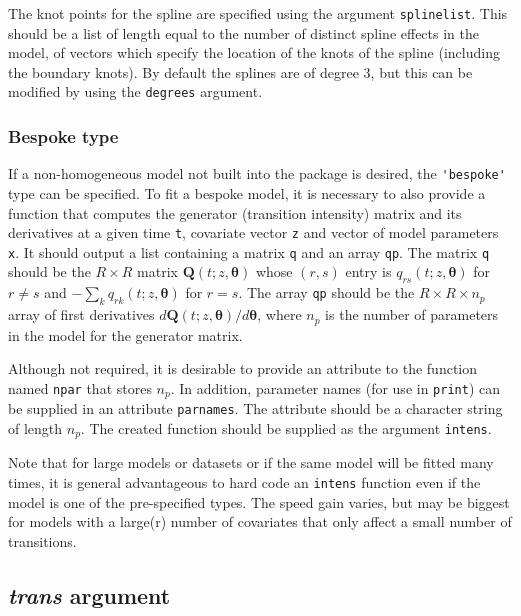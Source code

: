\documentclass{article}
\numberwithin{equation}{section}
\begin{document}
The knot points for the spline are specified using the argument \verb!splinelist!. This should be a list of length equal to the number of distinct spline effects in the model, of vectors which specify the location of the knots of the spline (including the boundary knots). By default the splines are of degree 3, but this can be modified by using the \verb!degrees! argument. 

\subsubsection*{Bespoke type}

If a non-homogeneous model not built into the package is desired, the \verb!'bespoke'! type can be specified. To fit a bespoke model, it is necessary to also provide a function that computes the generator (transition intensity) matrix and its derivatives at a given time \verb!t!, covariate vector \verb!z! and vector of model parameters \verb!x!. It should output a list containing a matrix \verb!q! and an array \verb!qp!. The matrix \verb!q! should be the $R \times R$ matrix $\mathbf{Q}(t; z, \bm\theta)$ whose $(r,s)$ entry is $q_{rs}(t; z, \bm\theta)$ for $r \neq s$ and $-\sum_{k} q_{rk}(t;z,\bm\theta)$ for $r = s$. The array \verb!qp! should be the $R \times R \times n_p$ array of first derivatives
${d\mathbf{Q}(t ; z, \bm\theta)}/{d\bm\theta}$, where $n_p$ is the number of parameters in the model for the generator matrix.

Although not required, it is desirable to provide an attribute to the function named \verb!npar! that stores $n_p$. In addition, parameter names (for use in \verb!print!) can be supplied in an attribute \verb!parnames!. The attribute should be a character string of length $n_p$. The created function should be supplied as the argument \verb!intens!. 

Note that for large models or datasets or if the same model will be fitted many times, it is general advantageous to hard code an \verb!intens! function even if the model is one of the pre-specified types. The speed gain varies, but may be biggest for models with a large(r) number of covariates that only affect a small number of transitions.



\subsection{{\it trans} argument}
\end{document}
